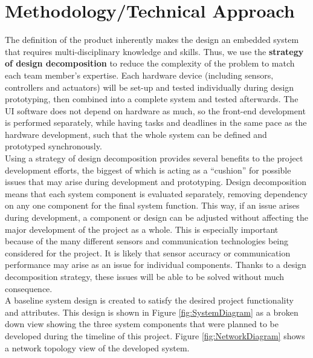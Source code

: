 \documentclass{report}
\begin{document}
\section{Methodology/Technical Approach}
The definition of the product inherently makes the design an embedded system that requires multi-disciplinary knowledge and skills. Thus, we use the \textbf{strategy of design decomposition} to reduce the complexity of the problem to match each team member's expertise. Each hardware device (including sensors, controllers and actuators) will be set-up and tested individually during design prototyping, then combined into a complete system and tested afterwards. The UI software does not depend on hardware as much, so the front-end development is performed separately, while having tasks and deadlines in the same pace as the hardware development, such that the whole system can be defined and prototyped synchronously. \\

Using a strategy of design decomposition provides several benefits to the project development efforts, the biggest of which is acting as a ``cushion'' for possible issues that may arise during development and prototyping. Design decomposition means that each system component is evaluated separately, removing dependency on any one component for the final system function. This way, if an issue arises during development, a component or design can be adjusted without affecting the major development of the project as a whole. This is especially important because of the many different sensors and communication technologies being considered for the project. It is likely that sensor accuracy or communication performance may arise as an issue for individual components. Thanks to a design decomposition strategy, these issues will be able to be solved without much consequence.\\

A baseline system design is created to satisfy the desired project functionality and attributes. This design is shown in Figure \ref{fig:SystemDiagram} as a broken down view showing the three system components that were planned to be developed during the timeline of this project. Figure \ref{fig:NetworkDiagram} shows a network topology view of the developed system.\\
\end{document}
